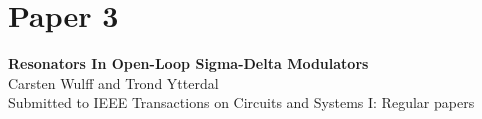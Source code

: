 \chapter{Paper 3}\label{sc:p3}
\textbf{\Large Resonators In Open-Loop Sigma-Delta Modulators}\\
\indent Carsten Wulff and Trond Ytterdal\\
\indent Submitted to IEEE Transactions on Circuits and Systems I: Regular papers\\
\renewcommand\myfigname{sdrfig:}
\renewcommand\myeqname{sdreq:}
\newcommand{\myappname}{Section }
\newcommand{\myappendices}{}

